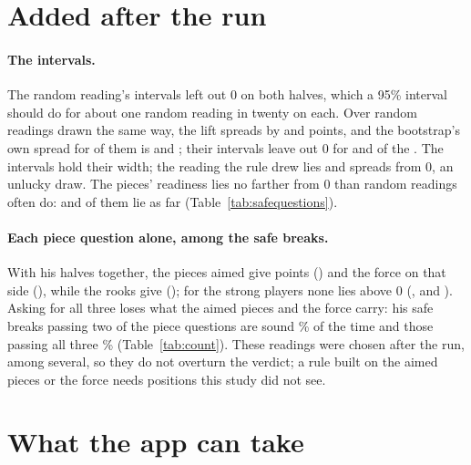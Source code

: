\documentclass[11pt]{article}
\begin{document}
\ChoiceTable

\section{Added after the run}
\label{sec:after}

\paragraph{The intervals.} The random reading's intervals left out 0 on both halves, which a
95\% interval should do for about one random reading in twenty on each. Over
\CalPermutations{} random readings drawn the same way, the lift spreads by \CalSpreadFirst{} and
\CalSpreadSecond{} points, and the bootstrap's own spread for \CalReadings{} of them is
\CalBootFirst{} and \CalBootSecond; their intervals leave out 0 for \CalExcludesFirst{} and
\CalExcludesSecond{} of the \CalReadings. The intervals hold their width; the reading the rule
drew lies \NullSdFirst{} and \NullSdSecond{} spreads from 0, an unlucky draw. The pieces'
readiness lies no farther from 0 than random readings often do: \CalPFirst{} and \CalPSecond{} of
them lie as far (Table~\ref{tab:safequestions}).

\paragraph{Each piece question alone, among the safe breaks.} With his halves together, the pieces
aimed give \SAimed{} points (\SAimedCi) and the force on that side \SForce{} (\SForceCi), while
the rooks give \SRooks{} (\SRooksCi); for the strong players none lies above 0 (\SAimedStrong,
\SRooksStrong{} and \SForceStrong). Asking for all three loses what the aimed pieces and the force
carry: his safe breaks passing two of the piece questions are sound \SafeTwo\% of the time and
those passing all three \SafeThree\% (Table~\ref{tab:count}). These readings were chosen after
the run, among several, so they do not overturn the verdict; a rule built on the aimed pieces or
the force needs positions this study did not see.

\SafeQuestionTable

\section{What the app can take}
\end{document}
